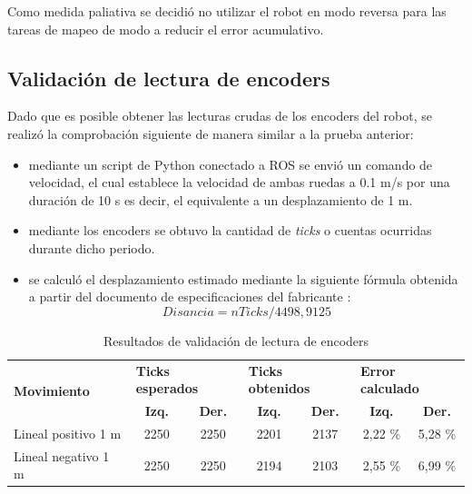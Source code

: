 Como medida paliativa se decidió no utilizar el robot en modo reversa para las tareas de mapeo de modo a reducir el error acumulativo.

\subsection{Validación de lectura de encoders}

Dado que es posible obtener las lecturas crudas de los encoders del robot, se realizó la comprobación siguiente de manera similar a la prueba anterior:

\begin{itemize}
    \item mediante un script de Python conectado a ROS se envió un comando de velocidad, el cual establece la velocidad de ambas ruedas a 0.1 m/s por una duración de 10 s es decir, el equivalente a un desplazamiento de 1 m.
    \item mediante los encoders se obtuvo la cantidad de \textit{ticks} o cuentas ocurridas durante dicho periodo.
    \item se calculó el desplazamiento estimado mediante la siguiente fórmula obtenida a partir del documento de especificaciones del fabricante \citep{PAPER:5}:
          \begin{equation}
              Disancia = nTicks / 4498,9125
          \end{equation}

\end{itemize}

\begin{table}
    \centering
    \caption[Lectura de encoders]{Resultados de validación de lectura de encoders}
    \begin{tabular}{lcccccc}
        \toprule
        \multirow{2}{*}{\textbf{Movimiento}} & \multicolumn{2}{l}{\textbf{Ticks esperados}} & \multicolumn{2}{l}{\textbf{Ticks obtenidos}} & \multicolumn{2}{l}{\textbf{Error calculado}}                                                 \\
                                             & \textbf{Izq.}                                & \textbf{Der.}                                & \textbf{Izq.}                                & \textbf{Der.} & \textbf{Izq.} & \textbf{Der.} \\
        \midrule
        Lineal positivo 1 m                  & 2250                                         & 2250                                         & 2201                                         & 2137          & 2,22 \%       & 5,28 \%       \\
        Lineal negativo 1 m                  & 2250                                         & 2250                                         & 2194                                         & 2103          & 2,55 \%       & 6,99 \%       \\
        \bottomrule
        \hline
    \end{tabular}
    \label{tab:lecturaEncoders}
\end{table}

